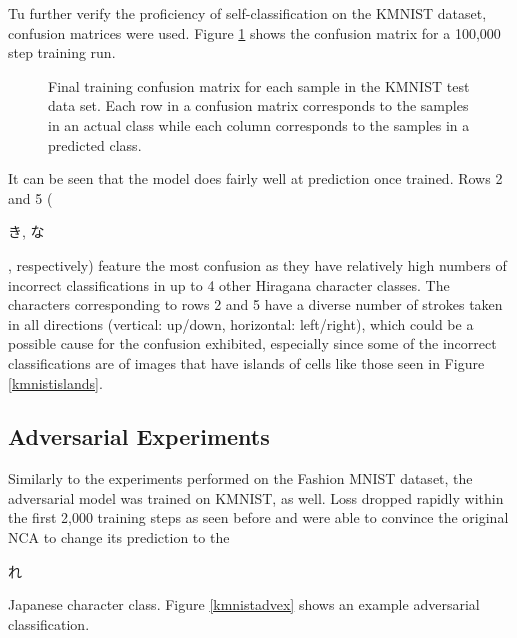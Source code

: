 \documentclass[conference]{IEEEtran}
\begin{document}
Tu further verify the proficiency of self-classification on the KMNIST dataset, confusion matrices were used. Figure \ref{kmnistconfusion} shows the confusion matrix for a 100,000 step training run.

\begin{figure}[htbp]
\caption{ Final training confusion matrix for each sample in the KMNIST test data set. Each row in a confusion matrix corresponds to the samples in an actual class while each column corresponds to the samples in a predicted class.}
\label{kmnistconfusion}
\end{figure}

It can be seen that the model does fairly well at prediction once trained. Rows 2 and 5 (\begin{CJK}{UTF8}{min}き, な\end{CJK}, respectively) feature the most confusion as they have relatively high numbers of incorrect classifications in up to 4 other Hiragana character classes.  The characters corresponding to rows 2 and 5 have a diverse number of strokes taken in all directions (vertical:  up/down, horizontal:  left/right), which could be a possible cause for the confusion exhibited, especially since some of the incorrect classifications are of images that have islands of cells like those seen in Figure \ref{kmnistislands}.

\subsection{Adversarial Experiments}

Similarly to the experiments performed on the Fashion MNIST dataset, the adversarial model was trained on KMNIST, as well. Loss dropped rapidly within the first 2,000 training steps as seen before and were able to convince the original NCA to change its prediction to the \begin{CJK}{UTF8}{min}れ\end{CJK} Japanese character class. Figure \ref{kmnistadvex} shows an example adversarial classification.
\end{document}
